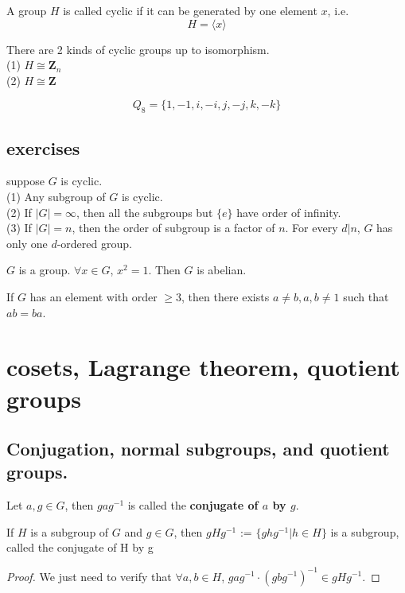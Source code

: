\documentclass[11pt,fleqn]{book} %
\begin{document}
\begin{CJK}{UTF8}{gkai}
\begin{definition}
	 A group $H$ is called cyclic if it can be generated by one element $x$, i.e.
	\[H = \langle x\rangle \]	
\end{definition}

\begin{lemma}
	There are 2 kinds of cyclic groups up to isomorphism. \\
	(1) $H \cong \textbf{Z}_n$ \\
	(2) $H \cong \textbf{Z}$
\end{lemma}

\begin{definition}
	\[Q_8 = \{1,-1,i,-i,j,-j,k,-k\}\]
\end{definition}

\subsection{exercises}
\begin{example}
	suppose $G$ is cyclic. \\ 
	(1) Any subgroup of $G$ is cyclic. \\
	(2) If $|G| = \infty$, then all the subgroups but $\{e\}$ have order of infinity. \\
	(3) If $|G| = n$, then the order of subgroup is a factor of $n$. For every $d | n$, $G$ has only one $d$-ordered group.
\end{example}

\begin{example}
	$G$ is a group. $\forall x \in G$, $x^2 = 1$. Then $G$ is abelian.
\end{example}
\begin{remark}
	If $G$ has an element with order $\geq 3$, then there exists $a\neq b, a,b\neq 1$ such that $ab = ba$.
\end{remark}

\section{cosets, Lagrange theorem, quotient groups}
\subsection{Conjugation, normal subgroups, and quotient groups.}
\begin{definition}
	[conjugate] Let $a, g \in G$, then $gag^{-1}$ is called the {\bf conjugate of $a$ by $g$}. 
\end{definition}
\begin{definition}
	[定义-命题] If $H$ is a subgroup of $G$ and $g \in G$, then $gHg^{-1}$
	:= $\{ghg^{-1}
	| h \in H\}$ is a
	subgroup, called the conjugate of H by g
\end{definition}
\begin{proof}
	We just need to verify that $\forall a,b \in H$, $gag^{-1}\cdot(gbg^{-1})^{-1} \in gHg^{-1}$. 
\end{proof}


\end{CJK}
\end{document}

